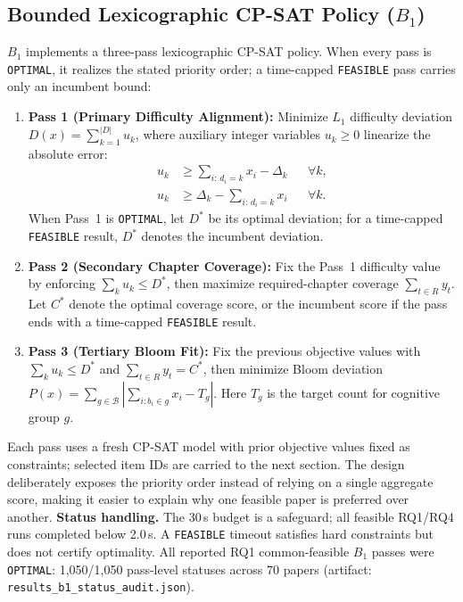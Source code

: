 \documentclass[runningheads]{llncs}
\begin{document}
\subsection{Bounded Lexicographic CP-SAT Policy ($B_1$)}
$B_1$ implements a three-pass lexicographic CP-SAT policy. When every pass is \texttt{OPTIMAL}, it realizes the stated priority order; a time-capped \texttt{FEASIBLE} pass carries only an incumbent bound:
\begin{enumerate}\setlength{\itemsep}{1pt}\setlength{\parskip}{0pt}
    \item \textbf{Pass 1 (Primary Difficulty Alignment):} Minimize $L_1$ difficulty deviation $D(x) = \sum_{k=1}^{|D|} u_k$, where auxiliary integer variables $u_k \ge 0$ linearize the absolute error:
    \begin{align}
    u_k &\ge \sum_{i:\,d_i=k} x_i - \Delta_k && \forall k, \label{eq:u_bounds} \\
    u_k &\ge \Delta_k - \sum_{i:\,d_i=k} x_i && \forall k.
    \end{align}
    When Pass~1 is \texttt{OPTIMAL}, let $D^*$ be its optimal deviation; for a time-capped \texttt{FEASIBLE} result, $D^*$ denotes the incumbent deviation.
    \item \textbf{Pass 2 (Secondary Chapter Coverage):} Fix the Pass~1 difficulty value by enforcing $\sum_k u_k \le D^*$, then maximize required-chapter coverage $\sum_{t\in R} y_t$. Let $C^*$ denote the optimal coverage score, or the incumbent score if the pass ends with a time-capped \texttt{FEASIBLE} result.
    \item \textbf{Pass 3 (Tertiary Bloom Fit):} Fix the previous objective values with $\sum_k u_k \le D^*$ and $\sum_{t\in R}y_t=C^*$, then minimize Bloom deviation $P(x)=\sum_{g\in\mathcal{B}} |\sum_{i:b_i\in g}x_i-T_g|$. Here $T_g$ is the target count for cognitive group $g$.
\end{enumerate}
Each pass uses a fresh CP-SAT model with prior objective values fixed as constraints; selected item IDs are carried to the next section. The design deliberately exposes the priority order instead of relying on a single aggregate score, making it easier to explain why one feasible paper is preferred over another.
\noindent\textbf{Status handling.} The 30\,s budget is a safeguard; all feasible RQ1/RQ4 runs completed below 2.0\,s. A \texttt{FEASIBLE} timeout satisfies hard constraints but does not certify optimality. All reported RQ1 common-feasible $B_1$ passes were \texttt{OPTIMAL}: 1,050/1,050 pass-level statuses across 70 papers (artifact: \texttt{results\_b1\_status\_audit.json}).
\end{document}
